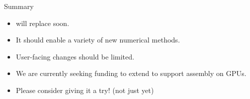 \documentclass[aspectratio=169]{beamer}
\begin{document}
\begin{frame}{Summary}
  \begin{itemize}
    \item
       will replace  soon.
    \item
      It should enable a variety of new numerical methods.
    \item
      User-facing changes should be limited.
  \end{itemize}

  \vspace{1em}

  \begin{itemize}
    \item
      We are currently seeking funding to extend  to support assembly on GPUs.
    \item
      Please consider giving it a try! (not just yet)
  \end{itemize}
\end{frame}

%
\end{document}
